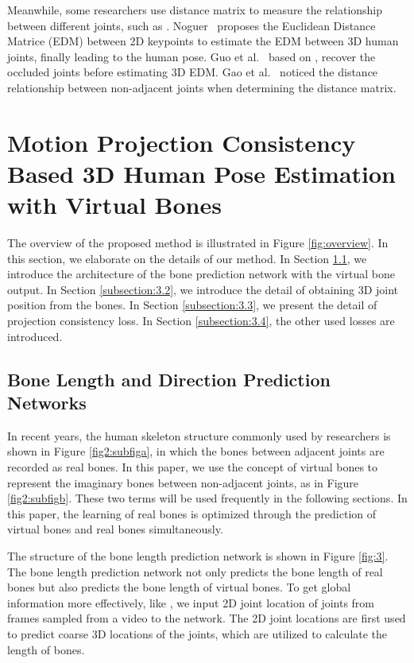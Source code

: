 \documentclass[journal]{IEEEtran}
\begin{document}
Meanwhile, some researchers use distance matrix to measure the relationship between different joints, such as \cite{moreno20173d,guo2018occluded,gao2019optimized}. Noguer~\cite{moreno20173d} proposes the Euclidean
Distance Matrice (EDM) between 2D keypoints to estimate the EDM between 3D human joints, finally leading to the human pose. Guo et al.~\cite{guo2018occluded} based on \cite{moreno20173d}, recover the occluded joints before estimating 3D EDM. Gao et al.~\cite{gao2019optimized} noticed the distance relationship between non-adjacent joints when determining the distance matrix.




\section{Motion Projection Consistency Based 3D Human Pose Estimation with Virtual Bones}

The overview of the proposed method is illustrated in Figure \ref{fig:overview}. In this section, we elaborate on the details of our method. In Section \ref{subsection:3.1}, we introduce the architecture of the bone prediction network with the virtual bone output. In Section \ref{subsection:3.2}, we introduce the detail of obtaining 3D joint position from the bones. In Section \ref{subsection:3.3}, we present the detail of projection consistency loss. In Section \ref{subsection:3.4}, the other used losses are introduced.
\subsection{Bone Length and Direction Prediction Networks}
\label{subsection:3.1}

In recent years, the human skeleton structure commonly used by researchers is shown in Figure \ref{fig2:subfiga}, in which the bones between adjacent joints are recorded as real bones. In this paper, we use the concept of virtual bones to represent the imaginary bones between non-adjacent joints, as in Figure \ref{fig2:subfigb}. These two terms will be used frequently in the following sections. In this paper, the learning of real bones is optimized through the prediction of virtual bones and real bones simultaneously.

The structure of the bone length prediction network is shown in Figure \ref{fig:3}. The bone length prediction network not only predicts the bone length of real bones but also predicts the bone length of virtual bones. To get global information more effectively, like \cite{2020Anatomy}, {we input 2D joint location  of  joints from  frames sampled from a video to the network. The 2D joint locations are first used to predict coarse 3D locations of the  joints, which are utilized to calculate the length of bones.} 
\end{document}
